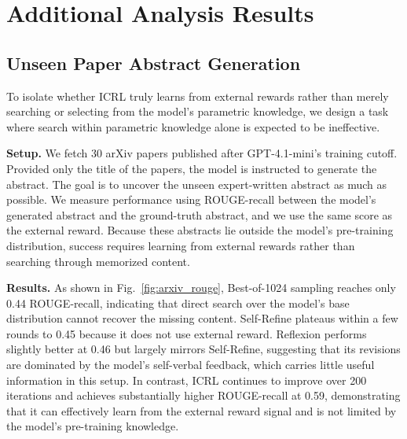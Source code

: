 \documentclass{article} %
\newcommand{\0}{\mathbf{0}}
\begin{document}
\newpage
\section{Additional Analysis Results}
\label{aditional analysis}
\subsection{Unseen Paper Abstract Generation}

To isolate whether ICRL truly learns from external rewards rather than merely searching or selecting from the model’s parametric knowledge, we design a task where search within parametric knowledge alone is expected to be ineffective.

\textbf{Setup.}
We fetch 30 arXiv papers published after GPT-4.1-mini’s training cutoff. Provided only the title of the papers, the model is instructed to generate the abstract. The goal is to uncover the unseen expert-written abstract as much as possible. We measure performance using ROUGE-recall between the model’s generated abstract and the ground-truth abstract, and we use the same score as the external reward. Because these abstracts lie outside the model’s pre-training distribution, success requires learning from external rewards rather than searching through memorized content.


\textbf{Results.}
As shown in Fig.~\ref{fig:arxiv_rouge}, Best-of-1024 sampling reaches only 0.44 ROUGE-recall, indicating that direct search over the model’s base distribution cannot recover the missing content.
Self-Refine plateaus within a few rounds to 0.45 because it does not use external reward. Reflexion performs slightly better at 0.46 but largely mirrors Self-Refine, suggesting that its revisions are dominated by the model's self-verbal feedback, which carries little useful information in this setup.
In contrast, ICRL continues to improve over 200 iterations and achieves substantially higher ROUGE-recall at 0.59, demonstrating that it can effectively learn from the external reward signal and is not limited by the model’s pre-training knowledge.




 

\end{document}
